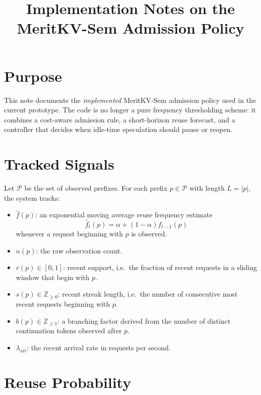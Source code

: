 \documentclass[11pt]{article}
\title{Implementation Notes on the MeritKV-Sem Admission Policy}
\author{}
\date{}
\begin{document}
\maketitle

\section{Purpose}

This note documents the \emph{implemented} MeritKV-Sem admission policy used in the
current prototype. The code is no longer a pure frequency thresholding scheme:
it combines a cost-aware admission rule, a short-horizon reuse forecast, and a
controller that decides when idle-time speculation should pause or reopen.

\section{Tracked Signals}

Let $\mathcal{P}$ be the set of observed prefixes. For each prefix $p \in \mathcal{P}$
with length $L = |p|$, the system tracks:

\begin{itemize}
    \item $\hat{f}(p)$: an exponential moving average reuse frequency estimate
    \[
        \hat{f}_t(p) = \alpha + (1-\alpha)\hat{f}_{t-1}(p)
    \]
    whenever a request beginning with $p$ is observed.

    \item $n(p)$: the raw observation count.

    \item $r(p) \in [0,1]$: recent support, i.e.\ the fraction of recent requests
    in a sliding window that begin with $p$.

    \item $s(p) \in \mathbb{Z}_{\ge 0}$: recent streak length, i.e.\ the number of
    consecutive most recent requests beginning with $p$.

    \item $b(p) \in \mathbb{Z}_{\ge 1}$: a branching factor derived from the number
    of distinct continuation tokens observed after $p$.

    \item $\lambda_{\mathrm{arr}}$: the recent arrival rate in requests per second.
\end{itemize}

\section{Reuse Probability}
\end{document}
